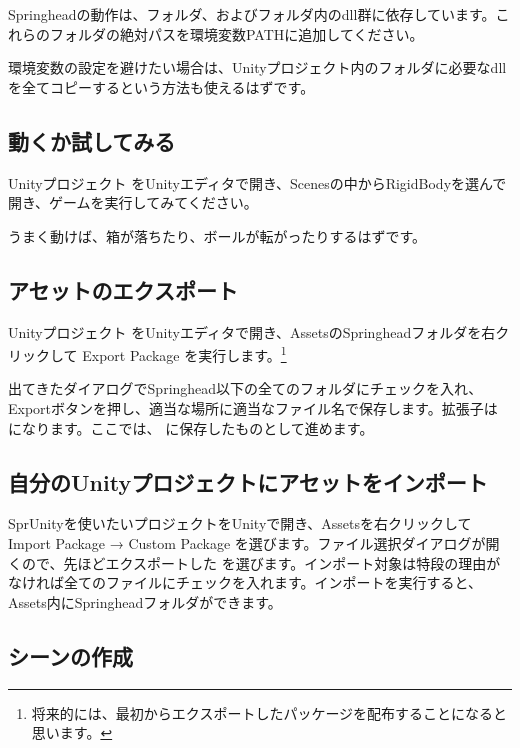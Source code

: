 Springheadの動作は、フォルダ、およびフォルダ内のdll群に依存しています。これらのフォルダの絶対パスを環境変数PATHに追加してください。

\KLUDGE 環境変数の設定を避けたい場合は、Unityプロジェクト内のフォルダに必要なdllを全てコピーするという方法も使えるはずです。


\subsection{動くか試してみる}

Unityプロジェクト  をUnityエディタで開き、Scenesの中からRigidBodyを選んで開き、ゲームを実行してみてください。

\KLUDGE うまく動けば、箱が落ちたり、ボールが転がったりするはずです。


\subsection{アセットのエクスポート}

Unityプロジェクト  をUnityエディタで開き、AssetsのSpringheadフォルダを右クリックして Export Package を実行します。\footnote{将来的には、最初からエクスポートしたパッケージを配布することになると思います。}

\KLUDGE 出てきたダイアログでSpringhead以下の全てのフォルダにチェックを入れ、Exportボタンを押し、適当な場所に適当なファイル名で保存します。拡張子は  になります。ここでは、 に保存したものとして進めます。

\subsection{自分のUnityプロジェクトにアセットをインポート} \label{sec:importasset}

SprUnityを使いたいプロジェクトをUnityで開き、Assetsを右クリックして Import Package → Custom Package を選びます。ファイル選択ダイアログが開くので、先ほどエクスポートした  を選びます。インポート対象は特段の理由がなければ全てのファイルにチェックを入れます。インポートを実行すると、Assets内にSpringheadフォルダができます。


\subsection{シーンの作成}

